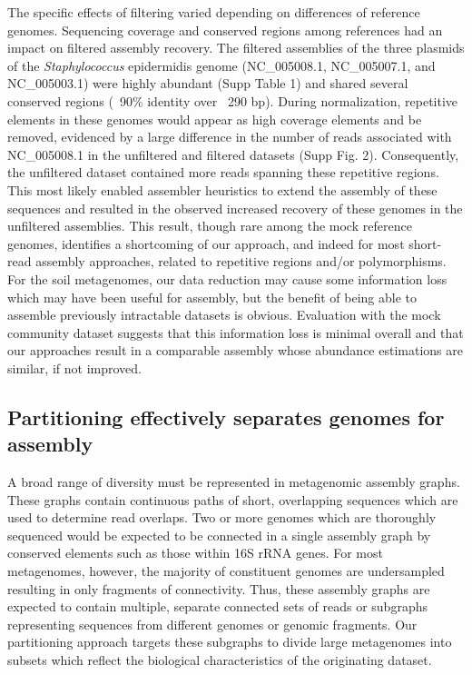 \documentclass[11pt]{article} %
\begin{document}
The specific effects of filtering varied depending on differences of
reference genomes.  Sequencing coverage and conserved regions among
references had an impact on filtered assembly recovery.  The filtered
assemblies of the three plasmids of the \emph{Staphylococcus}
epidermidis genome (NC\_005008.1, NC\_005007.1, and NC\_005003.1) were
highly abundant (Supp Table 1) and shared several conserved regions
(~90\% identity over ~290 bp).  During normalization, repetitive
elements in these genomes would appear as high coverage elements and
be removed, evidenced by a large difference in the number of reads
associated with NC\_005008.1 in the unfiltered and filtered datasets
(Supp Fig. 2). Consequently, the unfiltered dataset contained more
reads spanning these repetitive regions.  This most likely enabled
assembler heuristics to extend the assembly of these sequences and
resulted in the observed increased recovery of these genomes in the
unfiltered assemblies. This result, though rare among the mock
reference genomes, identifies a shortcoming of our approach, and
indeed for most short-read assembly approaches, related to repetitive
regions and/or polymorphisms.  For the soil metagenomes, our data
reduction may cause some information loss which may have been useful
for assembly, but the benefit of being able to assemble previously
intractable datasets is obvious.  Evaluation with the mock community
dataset suggests that this information loss is minimal overall and
that our approaches result in a comparable assembly whose abundance
estimations are similar, if not improved.

\subsection{Partitioning effectively separates genomes for assembly}

A broad range of diversity must be represented in metagenomic assembly
graphs.  These graphs contain continuous paths of short, overlapping
sequences which are used to determine read overlaps.  Two or more
genomes which are thoroughly sequenced would be expected to be
connected in a single assembly graph by conserved elements such as
those within 16S rRNA genes.  For most metagenomes, however, the
majority of constituent genomes are undersampled resulting in only
fragments of connectivity.  Thus, these assembly graphs are expected
to contain multiple, separate connected sets of reads or subgraphs
representing sequences from different genomes or genomic fragments.
Our partitioning approach targets these subgraphs to divide large
metagenomes into subsets which reflect the biological characteristics
of the originating dataset.
\end{document}
